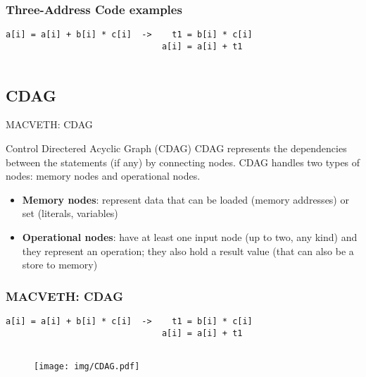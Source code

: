 \documentclass[xcolor=table,hideothersubsections,aspectratio=1610]{beamer}
\begin{document}
\begin{frame}[fragile]
\frametitle{Three-Address Code examples}

\begin{verbatim}
a[i] = a[i] + b[i] * c[i]  ->    t1 = b[i] * c[i]
                               a[i] = a[i] + t1
                                
\end{verbatim}

\end{frame}

\subsection{CDAG}
\begin{frame}{MACVETH: CDAG}
\begin{block}{Control Directered Acyclic Graph (CDAG)}
CDAG represents the dependencies between the statements (if any) by connecting nodes. CDAG handles two types of nodes: memory nodes and operational nodes.
\end{block}
\begin{itemize}
    \item \textbf{Memory nodes}: represent data that can be loaded (memory addresses) or set (literals, variables)
    \item \textbf{Operational nodes}: have at least one input node (up to two, any kind) and they represent an operation; they also hold a result value (that can also be a store to memory)
\end{itemize}
\end{frame}

\begin{frame}[fragile]
\frametitle{MACVETH: CDAG}
\begin{verbatim}
a[i] = a[i] + b[i] * c[i]  ->    t1 = b[i] * c[i]
                               a[i] = a[i] + t1
                                
\end{verbatim}

\begin{figure}
    \centering
    \texttt{[image: img/CDAG.pdf]}
\end{figure}
\end{frame}
\end{document}
